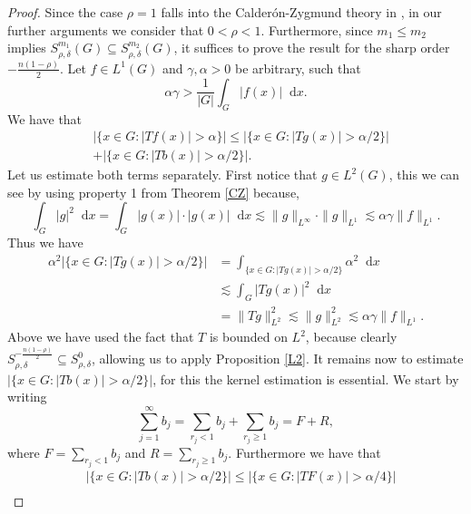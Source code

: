 \documentclass[12pt, reqno]{amsart}
\theoremstyle{definition}
\theoremstyle{remark}
\numberwithin{equation}{section}
\newcommand*\diff{\mathop{}\!\mathrm{d}}
\begin{document}
\begin{proof} Since the case $\rho=1$ falls into the Calder\'on-Zygmund theory in \cite{7}, in our further arguments we  consider that $0<\rho<1.$ Furthermore, since $m_1 \leq m_2$ implies $S^{m_1}_{\rho,\delta}(G) \subseteq S^{m_2}_{\rho,\delta}(G)$, it suffices to prove the result for the sharp order $-\frac{n(1-\rho)}{2}$.
    Let $f\in L^1(G)$ and $\gamma,\alpha>0$ be arbitrary, such that 
    \begin{equation*}
        \alpha\gamma>\frac{1}{|G|}\int_{G}|f(x)|\diff{x}.
    \end{equation*}
     We have that 
     \begin{eqnarray*}
     &|\{x\in G:|Tf(x)|>\alpha\}|\leq|\{x\in G:|Tg(x)|>\alpha/2\}|\\
     &+|\{x\in G:|Tb(x)|>\alpha/2\}|.
\end{eqnarray*}
    Let us estimate both terms separately. First notice that $g\in L^2(G)$, this we can see by using property 1 from Theorem \ref{CZ} because, 
    \begin{equation*}
        \int_{G}|g|^2\diff{x}=\int_{G}|g(x)|\cdot|g(x)|\diff{x}\lesssim\|g\|_{L^\infty}\cdot\|g\|_{L^1}\lesssim\alpha\gamma\|f\|_{L^1}.
    \end{equation*}
    Thus we have
    \begin{equation*}
    \begin{aligned}
        \alpha^2|\{x\in G: |Tg(x)|>\alpha/2\}|&=\int_{\{x\in G:|Tg(x)|>\alpha/2\}}\alpha^2\diff{x}\\
        &\lesssim\int_{G}|Tg(x)|^2\diff{x}\\
        &=\|Tg\|^{2}_{L^2}\lesssim\|g\|^2_{L^2}\lesssim\alpha\gamma\|f\|_{L^1}.
    \end{aligned}
    \end{equation*}
    Above we have used the fact that $T$ is bounded on $L^2$, because clearly $S^{-\frac{n(1-\rho)}{2}}_{\rho,\delta}\subseteq S^{0}_{\rho,\delta}$, allowing us to apply Proposition \ref{L2}. It remains now to estimate $|\{x\in G:|Tb(x)|>\alpha/2\}|$, for this the kernel estimation is essential. We start by writing 
    \begin{equation*}
        \sum_{j=1}^{\infty}b_j=\sum_{r_j<1}b_j+\sum_{r_j\geq 1}b_j=F+R,
    \end{equation*}
    where $F=\sum_{r_j<1}b_j$ and $R=\sum_{r_j\geq 1}b_j$. Furthermore we have that
     \begin{eqnarray*}
     &|\{x\in G:|Tb(x)|>\alpha/2\}|\leq|\{x\in G:|TF(x)|>\alpha/4\}|\\

\end{eqnarray*}
\end{proof}
\end{document}
